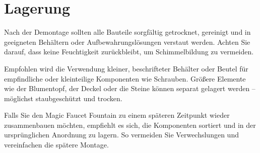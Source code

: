 %
%

\chapter{Lagerung}
Nach der Demontage sollten alle Bauteile sorgfältig getrocknet, gereinigt und in geeigneten Behältern oder Aufbewahrungslösungen verstaut werden. Achten Sie darauf, dass keine Feuchtigkeit zurückbleibt, um Schimmelbildung zu vermeiden.

Empfohlen wird die Verwendung kleiner, beschrifteter Behälter oder Beutel für empfindliche oder kleinteilige Komponenten wie Schrauben. Größere Elemente wie der Blumentopf, der Deckel oder die Steine können separat gelagert werden – möglichst staubgeschützt und trocken.

Falls Sie den Magic Faucet Fountain zu einem späteren Zeitpunkt wieder zusammenbauen möchten, empfiehlt es sich, die Komponenten sortiert und in der ursprünglichen Anordnung zu lagern. So vermeiden Sie Verwechslungen und vereinfachen die spätere Montage.